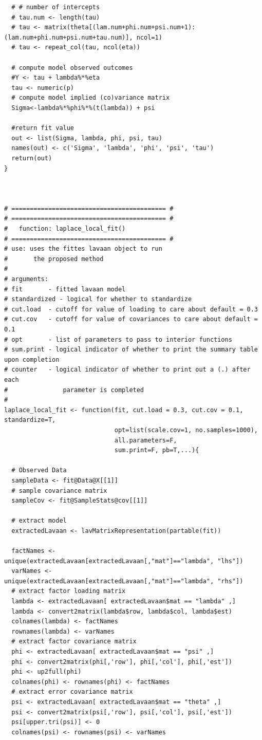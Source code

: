 \documentclass[man, noextraspace, floatsintext, 12pt]{apa7}
\begin{document}
\begin{lstlisting}
  # # number of intercepts
  # tau.num <- length(tau)
  # tau <- matrix(theta[(lam.num+phi.num+psi.num+1):(lam.num+phi.num+psi.num+tau.num)], ncol=1)
  # tau <- repeat_col(tau, ncol(eta))
  
  # compute model observed outcomes
  #Y <- tau + lambda%*%eta
  tau <- numeric(p)
  # compute model implied (co)variance matrix
  Sigma<-lambda%*%phi%*%(t(lambda)) + psi
  
  #return fit value 
  out <- list(Sigma, lambda, phi, psi, tau)
  names(out) <- c('Sigma', 'lambda', 'phi', 'psi', 'tau')
  return(out)
}



# ========================================== #
# ========================================== #
#   function: laplace_local_fit()
# ========================================== #
# use: uses the fittes lavaan object to run
#       the proposed method
#
# arguments:
# fit       - fitted lavaan model
# standardized - logical for whether to standardize
# cut.load  - cutoff for value of loading to care about default = 0.3 
# cut.cov   - cutoff for value of covariances to care about default = 0.1
# opt       - list of parameters to pass to interior functions
# sum.print - logical indicator of whether to print the summary table upon completion
# counter   - logical indicator of whether to print out a (.) after each
#               parameter is completed
#
laplace_local_fit <- function(fit, cut.load = 0.3, cut.cov = 0.1, standardize=T,
                              opt=list(scale.cov=1, no.samples=1000),
                              all.parameters=F,
                              sum.print=F, pb=T,...){
  
  # Observed Data
  sampleData <- fit@Data@X[[1]]
  # sample covariance matrix
  sampleCov <- fit@SampleStats@cov[[1]]
  
  # extract model
  extractedLavaan <- lavMatrixRepresentation(partable(fit))
  
  factNames <- unique(extractedLavaan[extractedLavaan[,"mat"]=="lambda", "lhs"])
  varNames <- unique(extractedLavaan[extractedLavaan[,"mat"]=="lambda", "rhs"])
  # extract factor loading matrix
  lambda <- extractedLavaan[ extractedLavaan$mat == "lambda" ,]
  lambda <- convert2matrix(lambda$row, lambda$col, lambda$est)
  colnames(lambda) <- factNames
  rownames(lambda) <- varNames
  # extract factor covariance matrix
  phi <- extractedLavaan[ extractedLavaan$mat == "psi" ,]
  phi <- convert2matrix(phi[,'row'], phi[,'col'], phi[,'est'])
  phi <- up2full(phi)
  colnames(phi) <- rownames(phi) <- factNames
  # extract error covariance matrix
  psi <- extractedLavaan[ extractedLavaan$mat == "theta" ,]
  psi <- convert2matrix(psi[,'row'], psi[,'col'], psi[,'est'])
  psi[upper.tri(psi)] <- 0
  colnames(psi) <- rownames(psi) <- varNames
  

\end{lstlisting}
\end{document}
